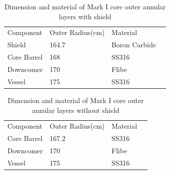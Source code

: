 \documentclass{elsarticle}
\begin{document}
\begin{table}
  \centering
  \begin{tabular}{llll}
    Component & Outer Radius(cm) & Material\\
    Shield & 164.7 & Boron Carbide\\
    Core Barrel & 168 & SS316\\
    Downcomer & 170 & Flibe\\
    Vessel & 175 & SS316
  \end{tabular}
  \caption{Dimension and material of Mark I core outer annular layers with shield\cite{Cisneros2013}}
  \label{tab:ol_shield}
\end{table}

\begin{table}
  \centering
  \begin{tabular}{llll}
    Component & Outer Radius(cm) & Material\\
    Core Barrel & 167.2 & SS316\\
    Downcomer & 170 & Flibe\\
    Vessel & 175 & SS316
  \end{tabular}
  \caption{Dimension and material of Mark I core outer annular layers without shield\cite{Andreades2016}}
  \label{tab:ol_no_shield}
\end{table}





\end{document}
